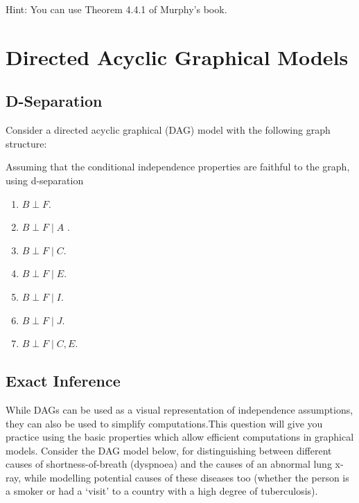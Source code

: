 \documentclass{article}
\begin{document}
Hint: You can use Theorem 4.4.1 of Murphy's book.

\section{Directed Acyclic Graphical Models}

\subsection{D-Separation}

Consider a  directed acyclic graphical (DAG) model with the following graph structure:

Assuming that the conditional independence properties are faithful to the graph, using d-separation 
\begin{enumerate}
\item $B \perp F$.
\item $B \perp F \; | \; A$ .
\item $B \perp F \; | \; C$.
\item $B \perp F \; | \; E$.
\item $B \perp F \; | \; I$.
\item $B \perp F \; | \; J$.
\item $B \perp F \; | \; C,E$.
\end{enumerate}



\subsection{Exact Inference}


While DAGs can be used as a visual representation of independence assumptions, they can also be used to simplify computations.This question will give you practice using the basic properties which allow efficient computations in graphical models.
Consider the DAG model below, for distinguishing between different causes of shortness-of-breath (dyspnoea) and the causes of an abnormal lung x-ray, while  modelling potential causes of these diseases too (whether the person is a smoker or had a `visit' to a country with a high degree of tuberculosis).

\end{document}
